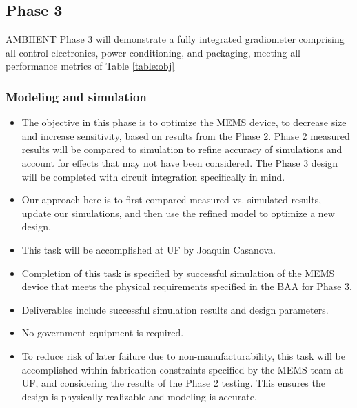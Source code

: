 \subsection{Phase 3}
AMBIIENT Phase 3 will demonstrate a fully integrated gradiometer comprising all control
electronics, power conditioning, and packaging, meeting all performance metrics of Table  \ref{table:obj}

\subsubsection{Modeling and simulation}\label{sec:p3:em}
\begin{itemize}
\item The objective in this phase is to optimize the MEMS device, to decrease size and increase sensitivity, based on results from the Phase 2. Phase 2 measured results will be compared to simulation to refine accuracy of simulations and account for effects that may not have been considered. The Phase 3 design will be completed with circuit integration specifically in mind.
\item Our approach here is to first compared measured vs. simulated results, update our simulations, and then use the refined model to optimize a new design.
\item This task will be accomplished at UF by Joaquin Casanova.
\item Completion of this task is specified by successful simulation of the MEMS device that meets the physical requirements specified in the BAA for Phase 3.
\item Deliverables include successful simulation results and design parameters.
\item No government equipment is required.
\item To reduce risk of later failure due to non-manufacturability, this task will be accomplished within fabrication constraints specified by the MEMS team at UF, and considering the results of the Phase 2 testing. This ensures the design is physically realizable and modeling is accurate.
\end{itemize}
